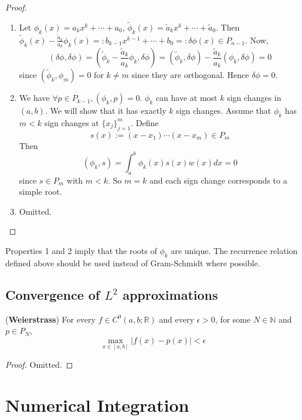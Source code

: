 \begin{proof}
	\hfill
	\begin{enumerate}
		\item Let $\phi_k(x) = a_k x^k + \cdots + a_0$, $\tilde{\phi}_k(x) = \tilde{a}_k x^k + \cdots + \tilde{a}_0$. Then $\tilde{\phi}_k(x) - \frac{\tilde{a}_k}{a_k} \phi_k(x) =: b_{k - 1} x^{k - 1} + \cdots + b_0 =: \delta \phi(x) \in P_{n - 1}$. Now,
		\[
			(\delta \phi, \delta \phi) = \left( \tilde{\phi}_k - \frac{\tilde{a}_k}{a_k} \phi_k, \delta \phi \right) = (\tilde{\phi}_k, \delta \phi) - \frac{\tilde{a}_k}{a_k} (\phi_k, \delta \phi) = 0
		\]
		since $(\tilde{\phi}_k, \phi_m) = 0$ for $k \ne m$ since they are orthogonal. Hence $\delta \phi = 0$.
		\item We have $\forall p \in P_{k - 1}, (\phi_k, p) = 0$. $\phi_k$ can have at most $k$ sign changes in $(a, b)$. We will show that it has exactly $k$ sign changes. Assume that $\phi_k$ has $m < k$ sign changes at $\{ x_j \}_{j = 1}^m$. Define
		\[
			s(x) := (x - x_1) \cdots (x - x_m) \in P_m
		\]
		Then
		\[
			(\phi_k, s) = \int_{a}^{b} \phi_k(x) s(x) w(x) dx = 0
		\]
		since $s \in P_m$ with $m < k$. So $m = k$ and each sign change corresponds to a simple root.
		\item Omitted.
	\end{enumerate}
\end{proof}

\begin{remark}
	Properties 1 and 2 imply that the roots of $\phi_k$ are unique. The recurrence relation defined above should be used instead of Gram-Schmidt where possible.
\end{remark}

\subsection{Convergence of $L^2$ approximations}

\begin{theorem}
	(\textbf{Weierstrass}) For every $f \in C^0 (a, b; \mathbb{R})$ and every $\epsilon > 0$, for some $N \in \mathbb{N}$ and $p \in P_N$,
	\[
		\max_{x \in [a, b]} |f(x) - p(x)| < \epsilon
	\]
\end{theorem}

\begin{proof}
	Omitted.
\end{proof}

\section{Numerical Integration}

